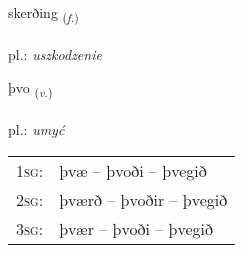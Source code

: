 \documentclass[frontgrid, backgrid]{flacards}\usepackage[]{graphicx}\usepackage[]{xcolor}
\begin{document}
\renewcommand{\flhead}{\vskip5pt \fboxsep=0pt {\small\bfseries\footnotesize Nafnorð | rzeczownik}}
\renewcommand{\fcfoot}{\vskip5pt \fboxsep=0pt \hspace{2pt}{\small\bfseries\footnotesize 3K}}

\renewcommand{\blhead}{\vskip5pt {\small\bfseries\footnotesize Nafnorð | rzeczownik }}
\renewcommand{\bcfoot}{\vskip5pt \hspace{2pt}{\small\bfseries\footnotesize 3K}}


{skerðing \small{\textsubscript{(\textit{f.})}} \\[1ex] %
\textphonetic{[scɛrðiŋk]} \\
pl.: \emph{uszkodzenie} \\  [2ex]
\renewcommand*{\arraystretch}{0.8}
}

\renewcommand{\flhead}{\vskip5pt \fboxsep=0pt {\small\bfseries\footnotesize Sagnorð | czasownik}}
\renewcommand{\fcfoot}{\vskip5pt \fboxsep=0pt \hspace{2pt}{\small\bfseries\footnotesize 3K}}

\renewcommand{\blhead}{\vskip5pt {\small\bfseries\footnotesize Sagnorð | czasownik }}
\renewcommand{\bcfoot}{\vskip5pt \hspace{2pt}{\small\bfseries\footnotesize 3K}}


{þvo \small{\textsubscript{(\textit{v.})}} \\[1ex] %
\textphonetic{[θvɔː]} \\
pl.: \emph{umyć} \\  [2ex]
\renewcommand*{\arraystretch}{0.8}
\begin{tabular}{p{1cm}l}
\textsc{1sg}: & þvæ -- þvoði -- þvegið \\ 
\textsc{2sg}: & þværð -- þvoðir -- þvegið \\ 
\textsc{3sg}: & þvær -- þvoði -- þvegið \\ 
\end{tabular}
}
\end{document}
